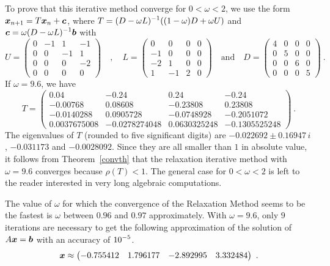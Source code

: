 {To prove that this iterative method converge for $0 < \omega < 2$, we
use the form $\bm{x}_{n+1} = T\bm{x}_n + \bm{c}$, where
$\displaystyle T = (D-\omega L)^{-1}((1-\omega)D + \omega U)$ and 
$\displaystyle \bm{c} = \omega (D-\omega L)^{-1}\bm{b}$ with
\[
U = \begin{pmatrix} 0 & -1 & 1 & -1 \\ 0 & 0 & -1 & 1 \\
0 & 0 & 0 & -2 \\ 0 & 0 & 0 & 0 \end{pmatrix} \quad ,
\quad L = \begin{pmatrix} 0 & 0 & 0 & 0 \\ -1 & 0 & 0 & 0 \\
-2 & 1 & 0 & 0 \\ 1 & -1 & 2 & 0 \end{pmatrix}  \quad \text{and}
\quad D = \begin{pmatrix} 4 & 0 & 0 & 0 \\ 0 & 5 & 0 & 0 \\
  0 & 0 & 6 & 0 \\ 0 & 0 & 0 & 5 \end{pmatrix} \ .
\]
If $\omega = 9.6$, we have
\[
  T = \begin{pmatrix}
0.04 & -0.24 &  0.24 & -0.24 \\
-0.00768 &  0.08608 & -0.23808 & 0.23808 \\
-0.0140288 &  0.0905728 & -0.0748928 & -0.2051072 \\
0.0037675008 & -0.0278274048 &  0.0630325248 & -0.1305525248
\end{pmatrix} \ .
\]
The eigenvalues of $T$ (rounded to five significant digits) are 
$-0.022692 \pm 0.16947\,i$, $-0.031173$ and $-0.0028092$.  Since
they are all smaller than $1$ in absolute value, it follows from
Theorem~\ref{convth} that the relaxation iterative method with
$\omega = 9.6$ converges because $\rho(T) < 1$.  The general case for
$0 < \omega < 2$ is left to the reader interested in very long
algebraic computations.

The value of $\omega$ for which the convergence of the Relaxation
Method seems to be the fastest is $\omega$ between $0.96$ and $0.97$
approximately.  With $\omega=9.6$, only $9$ iterations are necessary
to get the following approximation of the solution of
$A\bm{x} = \bm{b}$ with an accuracy of $\displaystyle 10^{-5}$.
\[
\bm{x} \approx \begin{pmatrix}
-0.755412 & 1.796177 & -2.892995 & 3.332484
\end{pmatrix} \ .
\]
}

